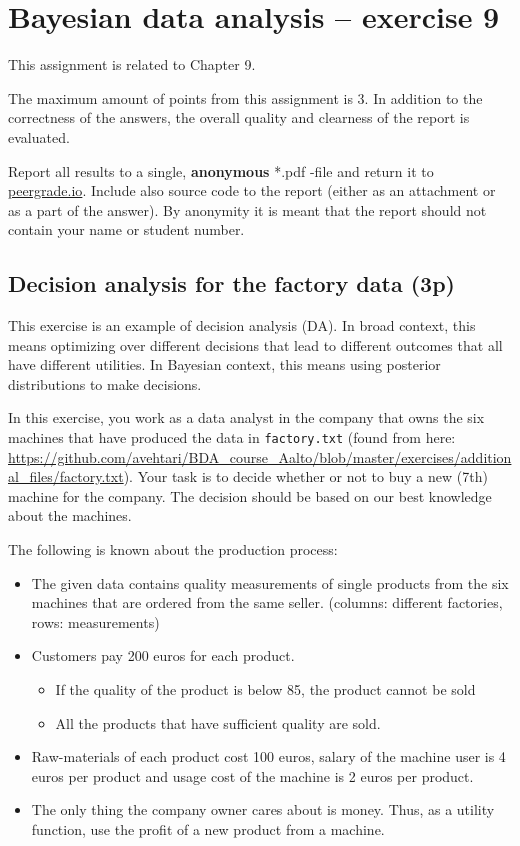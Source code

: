 \documentclass[a4paper,11pt]{article}
\begin{document}
\thispagestyle{empty}

\section*{Bayesian data analysis -- exercise 9}
This assignment is related to Chapter 9.

The maximum amount of points from this assignment is 3. In addition to the correctness of the answers, the overall quality and clearness of the report is evaluated.

Report all results to a single, {\bf anonymous} *.pdf -file and return it to \href{peergrade.io}{peergrade.io}. Include also source code to the report (either as an attachment or as a part of the answer). By anonymity it is meant that the report should not contain your name or student number.

\vspace{1cm}

\subsection*{Decision analysis for the factory data (3p)}

This exercise is an example of decision analysis (DA). In broad context, this means optimizing over different decisions that lead to different outcomes that all have different utilities. In Bayesian context, this means using posterior distributions to make decisions.  

In this exercise, you work as a data analyst in the company that owns the six machines that have produced the data in \texttt{factory.txt} (found from here: \url{https://github.com/avehtari/BDA_course_Aalto/blob/master/exercises/additional_files/factory.txt}). Your task is to decide whether or not to buy a new (7th) machine for the company. The decision should be based on our best knowledge about the machines.

The following is known about the production process: 
\begin{itemize} 
\item The given data contains quality measurements of single products from the six machines that are ordered from the same seller. (columns: different factories, rows: measurements)
\item Customers pay 200 euros for each product.
\begin{itemize}
\item If the quality of the product is below 85, the product cannot be sold 
\item All the products that have sufficient quality are sold.
\end{itemize}
\item Raw-materials of each product cost 100 euros, salary of the machine user is 4 euros per product and usage cost of the machine is 2 euros per product.
\item The only thing the company owner cares  about is money. Thus, as a utility function, use the profit of a new product from a machine.
\end{itemize}
\end{document}
